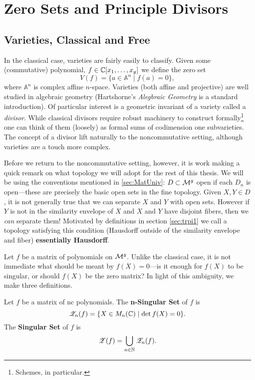 \chapter{Zero Sets and Principle Divisors}\label{ch:ZeroDiv}

\section{Varieties, Classical and Free}%
\label{sec:varieties}

In the classical case, varieties are fairly easily to classify. Given some
(commutative) polynomial, \(f \in \mathbb{C} [x_1, \dots, x_g]\) we define the zero set
\[
  V(f) = \{a \in \mathbb{A}^n \mid  f(a) =0\},
\]
where \(\mathbb{A}^n\) is complex affine \(n\)-space.  Varieties (both affine and
projective) are well studied in algebraic geometry
(Hartshorne's \emph{Alegbraic Geometry} \cite{hartshorneAlgebraic2008} is a
standard introduction). Of particular interest is a geometric invariant of a
variety called a \emph{divisor}. While classical divisors require robust machinery to
construct formally\footnote{Schemes, in particular.} one can think of them
(loosely) as formal sums of codimension one subvarieties. The concept of a
divisor lift naturally to the noncommutative setting, although varieties are
a touch more complex.

Before we return to the noncommutative setting, however, it is work making a
quick remark on what topology we will adopt for the rest of this thesis. We
will be using the conventions mentioned in
\cref{sec:MatUniv}: \( D \subset\mathcal{M}^{g} \) open if each \(D_n\) is open---these
are precisely the basic open sets in the fine topology.
Given \(X,Y \in D\), it is not generally true that we can separate \(X\) and
\(Y\) with open sets. However if \(Y\) is not in the similarity envelope of
\(X\) and \(X\) and \(Y\) have disjoint fibers, then we \emph{can} separate
them! Motivated by definitions in section \ref{sec:trpi1} we call a topology
satisfying this condition (Hausdorff outside of the similarity envelope and
fiber) \textbf{essentially Hausdorff}.



Let \(f\) be a matrix of polynomials on \(\mathcal{M}^{g} \).
Unlike the classical case, it is not immediate what should be meant by
\(f(X)=0\)---is it enough for \(f(X)\) to be singular, or should \(f(X)\) be the
zero matrix? In light of this ambiguity, we make three definitions.
\begin{definition}%
\label{def:singularset}
  Let \(f\) be a matrix of nc polynomials. The \textbf{n-Singular Set} of \(f\) is
  \[
    \mathscr{Z}_n(f) = \{X \in M_n (\mathbb{C}) \mid \det f(X) =0\}.
  \]
  The \textbf{Singular Set} of \(f\) is
  \[
    \mathscr{Z}(f) = \bigcup_{n \in \mathbb{N} } \mathscr{Z}_n(f).
  \]
\end{definition}


